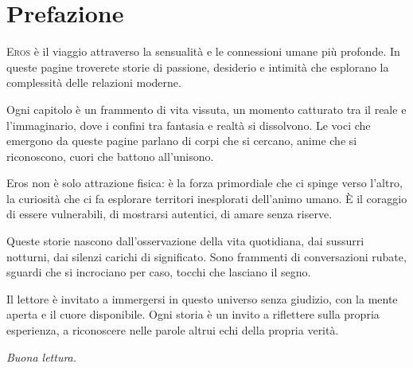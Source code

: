 \chapter{Prefazione}

\lettrine{E}{ros} è il viaggio attraverso la sensualità e le connessioni umane più profonde. In queste pagine troverete storie di passione, desiderio e intimità che esplorano la complessità delle relazioni moderne.

Ogni capitolo è un frammento di vita vissuta, un momento catturato tra il reale e l'immaginario, dove i confini tra fantasia e realtà si dissolvono. Le voci che emergono da queste pagine parlano di corpi che si cercano, anime che si riconoscono, cuori che battono all'unisono.

Eros non è solo attrazione fisica: è la forza primordiale che ci spinge verso l'altro, la curiosità che ci fa esplorare territori inesplorati dell'animo umano. È il coraggio di essere vulnerabili, di mostrarsi autentici, di amare senza riserve.

Queste storie nascono dall'osservazione della vita quotidiana, dai sussurri notturni, dai silenzi carichi di significato. Sono frammenti di conversazioni rubate, sguardi che si incrociano per caso, tocchi che lasciano il segno.

Il lettore è invitato a immergersi in questo universo senza giudizio, con la mente aperta e il cuore disponibile. Ogni storia è un invito a riflettere sulla propria esperienza, a riconoscere nelle parole altrui echi della propria verità.

\vspace{1em}
\textit{Buona lettura.}

\cleardoublepage   %
